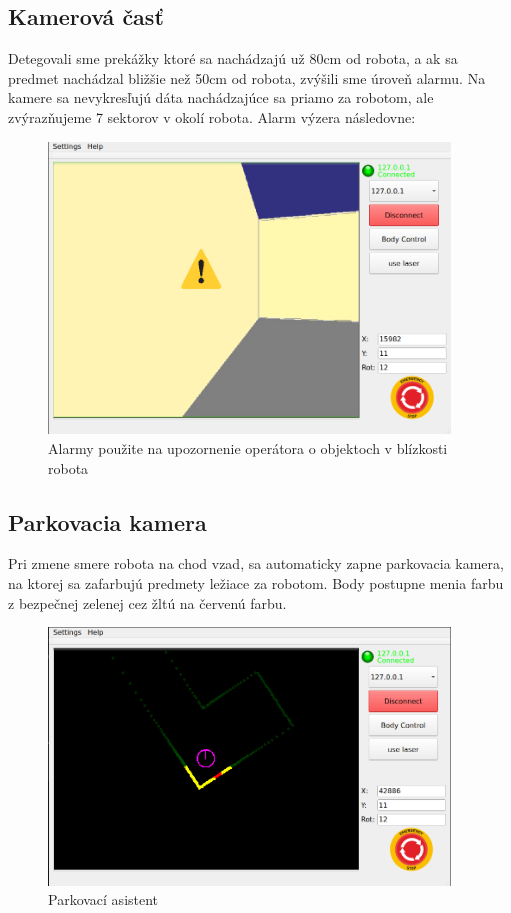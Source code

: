 \subsection{Kamerová časť}
Detegovali sme prekážky ktoré sa nachádzajú už 80cm od robota, a ak sa predmet nachádzal bližšie než 50cm od robota, zvýšili sme úroveň alarmu. Na kamere sa nevykresľujú dáta nachádzajúce sa priamo za robotom, ale zvýrazňujeme 7 sektorov v okolí robota.
Alarm výzera následovne:
\begin{figure}[!htbp]
	\begin{center}
		\includegraphics[width=0.95\textwidth]{img/alarm-all.png}
	\end{center}
	\caption{Alarmy použite na upozornenie operátora o objektoch v blízkosti robota}
	\label{fig:alarm}
\end{figure}
\subsection{Parkovacia kamera}
Pri zmene smere robota na chod vzad, sa automaticky zapne parkovacia kamera, na ktorej sa zafarbujú predmety ležiace za robotom. Body postupne menia farbu z bezpečnej zelenej cez žltú na červenú farbu.
\begin{figure}[!htbp]
	\begin{center}
		\includegraphics[width=0.95\textwidth]{img/parking_camera.png}
	\end{center}
	\caption{Parkovací asistent}
	\label{fig:parking}
\end{figure}

